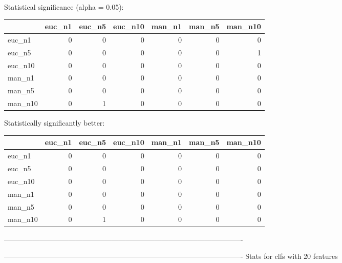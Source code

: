Statistical significance (alpha = 0.05):
 \begin{tabular}{lrrrrrr}
\hline
         &   euc\_n1 &   euc\_n5 &   euc\_n10 &   man\_n1 &   man\_n5 &   man\_n10 \\
\hline
 euc\_n1  &        0 &        0 &         0 &        0 &        0 &         0 \\
 euc\_n5  &        0 &        0 &         0 &        0 &        0 &         1 \\
 euc\_n10 &        0 &        0 &         0 &        0 &        0 &         0 \\
 man\_n1  &        0 &        0 &         0 &        0 &        0 &         0 \\
 man\_n5  &        0 &        0 &         0 &        0 &        0 &         0 \\
 man\_n10 &        0 &        1 &         0 &        0 &        0 &         0 \\
\hline
\end{tabular} 

Statistically significantly better:
 \begin{tabular}{lrrrrrr}
\hline
         &   euc\_n1 &   euc\_n5 &   euc\_n10 &   man\_n1 &   man\_n5 &   man\_n10 \\
\hline
 euc\_n1  &        0 &        0 &         0 &        0 &        0 &         0 \\
 euc\_n5  &        0 &        0 &         0 &        0 &        0 &         0 \\
 euc\_n10 &        0 &        0 &         0 &        0 &        0 &         0 \\
 man\_n1  &        0 &        0 &         0 &        0 &        0 &         0 \\
 man\_n5  &        0 &        0 &         0 &        0 &        0 &         0 \\
 man\_n10 &        0 &        1 &         0 &        0 &        0 &         0 \\
\hline
\end{tabular} 

----------------------------------------------------------------------------------------------------



----------------------------------------------------------------------------------------------------
Stats for clfs with 20 features


